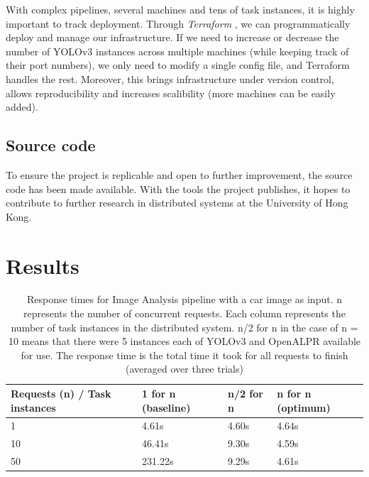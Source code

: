 \documentclass{report}
\begin{document}
With complex pipelines, several machines and tens of task instances, it is highly important to track deployment.
Through \textit{Terraform} \cite{Terraform}, we can programmatically deploy and manage our infrastructure.
If we need to increase or decrease the number of YOLOv3 instances across multiple machines (while keeping track of their port numbers), we only need to modify a single config file, and Terraform handles the rest.
Moreover, this brings infrastructure under version control, allows reproducibility and increases scalibility (more machines can be easily added).

\section{Source code}

To ensure the project is replicable and open to further improvement, the source code has been made available. \cite{SourceCode}
With the tools the project publishes, it hopes to contribute to further research in distributed systems at the University of Hong Kong.

\chapter{Results}\label{chap:results}

\begin{table}[h!]
  \begin{center}
    \caption{Response times for Image Analysis pipeline with a car image as input. n represents the number of concurrent requests. Each column represents the number of task instances in the distributed system. n/2 for n in the case of n = 10 means that there were 5 instances each of YOLOv3 and OpenALPR available for use. The response time is the total time it took for all requests to finish (averaged over three trials)}
    \label{tab:results}
    \begin{tabular}{|l|l|l|l|}
      \hline
      Requests (n) / Task instances & 1 for n (baseline) & n/2 for n & n for n (optimum) \\ \hline
      1                                                 & 4.61s      & 4.60s        & 4.64s      \\ \hline
      10                                                & 46.41s      & 9.30s        & 4.59s      \\ \hline
      50                                               & 231.22s      & 9.29s        & 4.61s     \\ \hline
      \end{tabular}
  \end{center}
\end{table}
\end{document}
